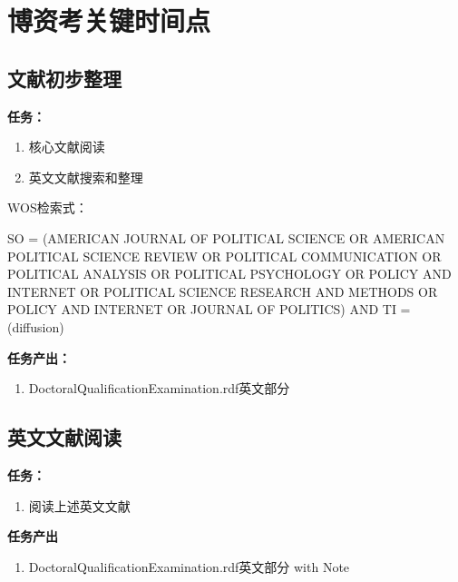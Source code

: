 \documentclass[
  12pt,
]{ctexart}
\providecommand{\tightlist}{%
  \setlength{\itemsep}{0pt}\setlength{\parskip}{0pt}}
\begin{document}
\hypertarget{ux535aux8d44ux8003ux5173ux952eux65f6ux95f4ux70b9}{%
\section{博资考关键时间点}\label{ux535aux8d44ux8003ux5173ux952eux65f6ux95f4ux70b9}}

\hypertarget{ux6587ux732eux521dux6b65ux6574ux7406}{%
\subsection{文献初步整理}\label{ux6587ux732eux521dux6b65ux6574ux7406}}

\textbf{任务：}

\begin{enumerate}
\def\labelenumi{\arabic{enumi}.}
\item
  核心文献阅读
\item
  英文文献搜索和整理
\end{enumerate}

WOS检索式：

SO = (AMERICAN JOURNAL OF POLITICAL SCIENCE OR AMERICAN POLITICAL SCIENCE REVIEW OR POLITICAL COMMUNICATION OR POLITICAL ANALYSIS OR POLITICAL PSYCHOLOGY OR POLICY AND INTERNET OR POLITICAL SCIENCE RESEARCH AND METHODS OR POLICY AND INTERNET OR JOURNAL OF POLITICS) AND TI = (diffusion)

\textbf{任务产出：}

\begin{enumerate}
\def\labelenumi{\arabic{enumi}.}
\tightlist
\item
  DoctoralQualificationExamination.rdf英文部分
\end{enumerate}

\hypertarget{ux82f1ux6587ux6587ux732eux9605ux8bfb}{%
\subsection{英文文献阅读}\label{ux82f1ux6587ux6587ux732eux9605ux8bfb}}

\textbf{任务：}

\begin{enumerate}
\def\labelenumi{\arabic{enumi}.}
\tightlist
\item
  阅读上述英文文献
\end{enumerate}

\textbf{任务产出}

\begin{enumerate}
\def\labelenumi{\arabic{enumi}.}
\tightlist
\item
  DoctoralQualificationExamination.rdf英文部分 with Note
\end{enumerate}
\end{document}
